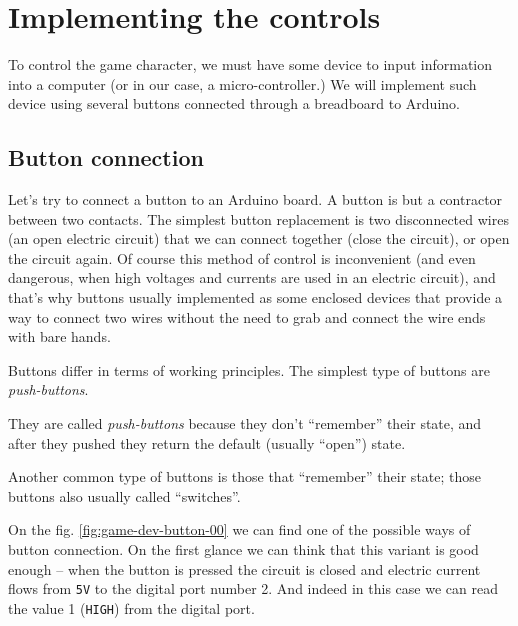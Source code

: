 \documentclass[../sparc.tex]{subfiles}
\begin{document}
\section{Implementing the controls}
\label{section:game-dev-controls}

To control the game character, we must have some device to input information
into a computer (or in our case, a micro-controller.)  We will implement such
device using several buttons connected through a breadboard to Arduino.

\subsection{Button connection}

Let's try to connect a button to an Arduino board.  A button is but a contractor
between two contacts.  The simplest button replacement is two disconnected wires
(an open electric circuit) that we can connect together (close the circuit), or
open the circuit again.  Of course this method of control is inconvenient (and
even dangerous, when high voltages and currents are used in an electric
circuit), and that's why buttons usually implemented as some enclosed devices
that provide a way to connect two wires without the need to grab and connect the
wire ends with bare hands.

Buttons differ in terms of working principles.  The simplest type of buttons are
\emph{push-buttons}.

They are called \emph{push-buttons} because they don't ``remember'' their state,
and after they pushed they return the default (usually ``open'') state.

Another common type of buttons is those that ``remember'' their state; those
buttons also usually called ``switches''.

On the fig. \ref{fig:game-dev-button-00} we can find one of the possible ways of
button connection.  On the first glance we can think that this variant is good
enough -- when the button is pressed the circuit is closed and electric current
flows from \texttt{5V} to the digital port number 2.  And indeed in this case we
can read the value 1 (\texttt{HIGH}) from the digital port.

\end{document}
